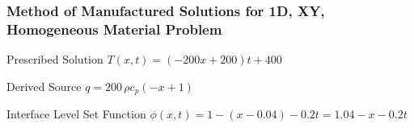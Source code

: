 \documentclass[]{beamer}
\begin{document}
\begin{frame}[t]\frametitle{Method of Manufactured Solutions for 1D, XY, Homogeneous Material Problem}
\begin{block}{Prescribed Solution}
    $T(x,t) = (-200x+200)t + 400$
  \end{block}
  
  \begin{block}{Derived Source}
  $q = 200\,\rho c_p \left(-x+1\right)$
  \end{block}
  
  \begin{block}{Interface Level Set Function}
    $\phi(x,t) = 1 - (x - 0.04) - 0.2t = 1.04 - x - 0.2t$
  \end{block}
\end{frame}

%
%			
%			
%			
%			
\end{document}
